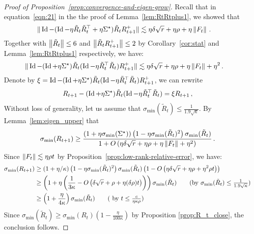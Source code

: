 \begin{proof}[Proof of Proposition~\ref{prop:convergence-and-eigen-grow}]
Recall that in equation~\eqref{eqn:21} in the the proof of Lemma~\ref{lem:RtRtplus1}, we showed  that 
\begin{align*}
\|\operatorname{Id} - (\operatorname{Id} - \eta \tilde{R}_t\tilde{R}_t^\top + \eta {{\Sigma}^\star}) \tilde{R}_tR_{t+1}^+\|& \lesssim \eta\delta\sqrt{r}  + \eta \rho + \eta\left\|F_t\right\|\,.\nonumber
\end{align*}
Together with $\left\|\tilde{R}_t\right\| \leq 6$ and $\left\|\tilde{R}_t R_{t + 1}^+\right\| \leq 2$ by Corollary~\ref{cor:stat} and Lemma~\ref{lem:RtRtplus1} respectively, we have:
\begin{align*}
\|\operatorname{Id}- (\operatorname{Id} + \eta {{\Sigma}^\star}) \tilde{R}_t (\operatorname{Id} - \eta \tilde{R}_t^{\top}\tilde{R}_t )  R_{t + 1}^+\|& \lesssim \eta \delta\sqrt{r}  + \eta \rho + \eta\left\|F_t\right\| + \eta^2\,.
\end{align*}
Denote by  $\xi = \operatorname{Id}- (\operatorname{Id} + \eta {{\Sigma}^\star}) \tilde{R}_t (\operatorname{Id} - \eta \tilde{R}_t^{\top}\tilde{R}_t )  R_{t + 1}^+$, we can rewrite
\begin{align*}
R_{t + 1} - (\operatorname{Id} + \eta {{\Sigma}^\star}) \tilde{R}_t (\operatorname{Id} - \eta \tilde{R}_t^{\top}\tilde{R}_t )   = \xi R_{t + 1} \,,
\end{align*}
Without loss of generality, let us assume that $\sigma_{\min}(\tilde{R}_t) \leq \frac{1}{1.9 \sqrt{\kappa}}$.  By Lemma~\ref{lem:eigen_upper} that
\begin{align*}
\sigma_{\min}(R_{t + 1}) \geq \frac{(1 + \eta \sigma_{\min} ({{\Sigma}^\star})) \left(1 - \eta \sigma_{\min}(\tilde{R}_t)^2\right) \sigma_{\min}(\tilde{R}_t) }{1  +O\left( \eta \delta\sqrt{r}  +\eta \rho +\eta\left\|F_t\right\| + \eta^2 \right) }\,.
\end{align*}
Since $\left\|F_t\right\| \lesssim \eta \rho t$ by Proposition~\ref{prop:low-rank-relative-error}, we have:
\begin{align*}
\sigma_{\min}(R_{t + 1}) & \geq (1 + \eta / \kappa) \left(1 - \eta \sigma_{\min}(\tilde{R}_t)^2\right) \sigma_{\min}(\tilde{R}_t) \left(1 - O \left( \eta \delta\sqrt{r}  + \eta \rho + \eta^2\rho t \right) \right)\\
& \ge \left(1 + \eta  \left(\frac{1} {3\kappa} -  O \left( \delta\sqrt{r}  +  \rho + \eta(\delta \rho) t \right) \right)  \right)\sigma_{\min}(\tilde{R}_t)  \tag{by $ \sigma_{\min}(\tilde{R}_t) \leq \frac{1}{1.9\sqrt{\kappa}}$}\\
& \ge \left(1 +   \frac{\eta} {4\kappa}   \right)\sigma_{\min}(\tilde{R}_t)  \tag{ by $t \le \frac{c}{\eta \kappa  \rho}$}
\end{align*}
Since  $\sigma_{\min}(\tilde{R}_t ) \geq \sigma_{\min}(R_t)\left( 1 - \frac{\eta}{100 \kappa} \right)$ by Proposition \ref{prop:R_t_close},
the conclusion follows.
\end{proof}


